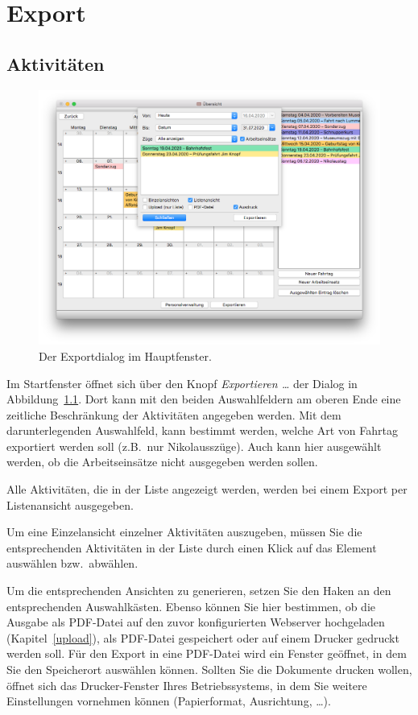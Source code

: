 \chapter{Export}\label{export}
\section{Aktivitäten}\label{export:aktivitaeten}
\begin{figure}[!h]
	\includegraphics[width=\textwidth]{img/export}
	\caption{Der Exportdialog im Hauptfenster.}
	\label{fig:export:aktivitaeten}
\end{figure}
Im Startfenster öffnet sich über den Knopf \emph{Exportieren \dots} der Dialog in Abbildung~\ref{fig:export:aktivitaeten}.
Dort kann mit den beiden Auswahlfeldern am oberen Ende eine zeitliche Beschränkung der Aktivitäten angegeben werden.
Mit dem darunterlegenden Auswahlfeld, kann bestimmt werden, welche Art von Fahrtag exportiert werden soll (z.B.\ nur Nikolausszüge).
Auch kann hier ausgewählt werden, ob die Arbeitseinsätze nicht ausgegeben werden sollen.

Alle Aktivitäten, die in der Liste angezeigt werden, werden bei einem Export per Listenansicht ausgegeben.

Um eine Einzelansicht einzelner Aktivitäten auszugeben, müssen Sie die entsprechenden Aktivitäten in der Liste durch einen Klick auf das Element auswählen bzw.\ abwählen.

Um die entsprechenden Ansichten zu generieren, setzen Sie den Haken an den entsprechenden Auswahlkästen.
Ebenso können Sie hier bestimmen, ob die Ausgabe als PDF-Datei auf den zuvor konfigurierten Webserver hochgeladen (Kapitel~\ref{upload}),
als PDF-Datei gespeichert oder auf einem Drucker gedruckt werden soll.
Für den Export in eine PDF-Datei wird ein Fenster geöffnet, in dem Sie den Speicherort auswählen können.
Sollten Sie die Dokumente drucken wollen,
öffnet sich das Drucker-Fenster Ihres Betriebssystems,
in dem Sie weitere Einstellungen vornehmen können (Papierformat, Ausrichtung, \dots).

